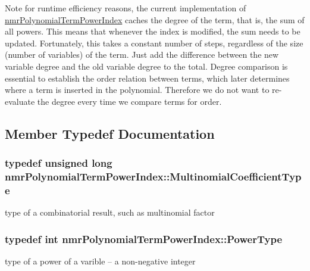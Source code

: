 \begin{DoxyNote}{Note}
for runtime efficiency reasons, the current implementation of \hyperlink{classnmr_polynomial_term_power_index}{nmr\+Polynomial\+Term\+Power\+Index} caches the degree of the term, that is, the sum of all powers. This means that whenever the index is modified, the sum needs to be updated. Fortunately, this takes a constant number of steps, regardless of the size (number of variables) of the term. Just add the difference between the new variable degree and the old variable degree to the total. Degree comparison is essential to establish the order relation between terms, which later determines where a term is inserted in the polynomial. Therefore we do not want to re-\/evaluate the degree every time we compare terms for order. 
\end{DoxyNote}


\subsection{Member Typedef Documentation}
\hypertarget{classnmr_polynomial_term_power_index_a09f482da776cfb829e26ad1fb381ab94}{}
\subsubsection[{Multinomial\+Coefficient\+Type}]{\setlength{\rightskip}{0pt plus 5cm}typedef unsigned long {\bf nmr\+Polynomial\+Term\+Power\+Index\+::\+Multinomial\+Coefficient\+Type}}\label{classnmr_polynomial_term_power_index_a09f482da776cfb829e26ad1fb381ab94}
type of a combinatorial result, such as multinomial factor \hypertarget{classnmr_polynomial_term_power_index_a2eec01c3a2c3f56f47982ceffd8e36ed}{}
\subsubsection[{Power\+Type}]{\setlength{\rightskip}{0pt plus 5cm}typedef int {\bf nmr\+Polynomial\+Term\+Power\+Index\+::\+Power\+Type}}\label{classnmr_polynomial_term_power_index_a2eec01c3a2c3f56f47982ceffd8e36ed}
type of a power of a varible -- a non-\/negative integer \hypertarget{classnmr_polynomial_term_power_index_ac982d5f82c3a95968e92d54c92cbc3e0}{}
